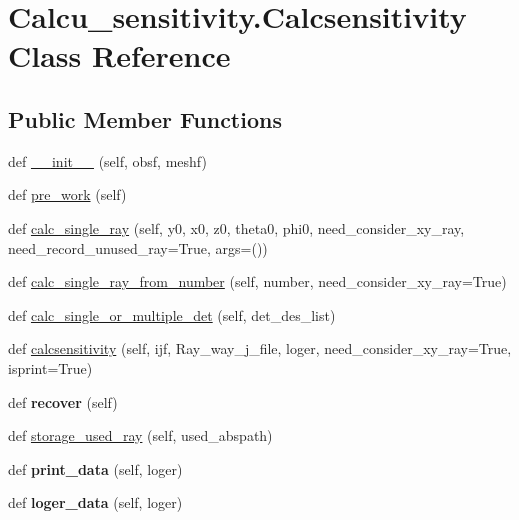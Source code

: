 \hypertarget{classCalcu__sensitivity_1_1Calcsensitivity}{}\section{Calcu\+\_\+sensitivity.\+Calcsensitivity Class Reference}
\label{classCalcu__sensitivity_1_1Calcsensitivity}
\subsection*{Public Member Functions}
\begin{DoxyCompactItemize}
\item 
def \hyperlink{classCalcu__sensitivity_1_1Calcsensitivity_a9bf566a9069b3efcb5bb388aa87f86c0}{\+\_\+\+\_\+init\+\_\+\+\_\+} (self, obsf, meshf)
\item 
def \hyperlink{classCalcu__sensitivity_1_1Calcsensitivity_a4b1fd897d17dde2abc328282bb4df5d2}{pre\+\_\+work} (self)
\item 
def \hyperlink{classCalcu__sensitivity_1_1Calcsensitivity_a7441d0b4067ad69833a78eb21461d596}{calc\+\_\+single\+\_\+ray} (self, y0, x0, z0, theta0, phi0, need\+\_\+consider\+\_\+xy\+\_\+ray, need\+\_\+record\+\_\+unused\+\_\+ray=True, args=())
\item 
def \hyperlink{classCalcu__sensitivity_1_1Calcsensitivity_a2bb4f42d1e79c2b6d62f16a84685ba61}{calc\+\_\+single\+\_\+ray\+\_\+from\+\_\+number} (self, number, need\+\_\+consider\+\_\+xy\+\_\+ray=True)
\item 
def \hyperlink{classCalcu__sensitivity_1_1Calcsensitivity_a4303bc1d11d8cad584594f8b9584914d}{calc\+\_\+single\+\_\+or\+\_\+multiple\+\_\+det} (self, det\+\_\+des\+\_\+list)
\item 
def \hyperlink{classCalcu__sensitivity_1_1Calcsensitivity_aede00bb6135485d40e67980414bf1ebc}{calcsensitivity} (self, ijf, Ray\+\_\+way\+\_\+j\+\_\+file, loger, need\+\_\+consider\+\_\+xy\+\_\+ray=True, isprint=True)
\item 
\mbox{\label{classCalcu__sensitivity_1_1Calcsensitivity_aeaf0cb729f018bdb1a0db49b64ea8359}} 
def {\bfseries recover} (self)
\item 
def \hyperlink{classCalcu__sensitivity_1_1Calcsensitivity_a6a9a7e006d3766b4c46db8d922d5853f}{storage\+\_\+used\+\_\+ray} (self, used\+\_\+abspath)
\item 
\mbox{\label{classCalcu__sensitivity_1_1Calcsensitivity_a1bf8f17dae24038b4549ce2f2fe0998d}} 
def {\bfseries print\+\_\+data} (self, loger)
\item 
\mbox{\label{classCalcu__sensitivity_1_1Calcsensitivity_a5e4058aac5ad5b4664b954583d1129b1}} 
def {\bfseries loger\+\_\+data} (self, loger)
\end{DoxyCompactItemize}
